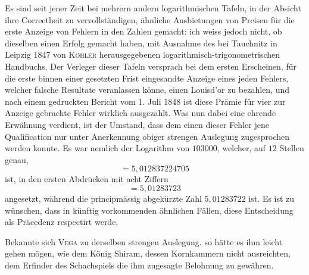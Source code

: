 Es sind seit jener Zeit bei mehrern andern logarithmischen Tafeln, in der
Absicht ihre Correctheit zu vervollständigen, ähnliche Ausbietungen von Preisen
für die erste Anzeige von Fehlern in den Zahlen gemacht: ich weiss jedoch nicht,
ob dieselben einen Erfolg gemacht haben, mit Ausnahme des bei Tauchnitz in
Leipzig $1847$ von \textsc{Köhler} herausgegebenen logarithmisch-trigonometrischen Handbuchs. Der Verleger dieser Tafeln versprach bei dem ersten Erscheinen, für die erste
binnen einer gesetzten Frist eingesandte Anzeige eines jeden Fehlers, welcher
falsche Resultate veranlassen könne, einen Louisd'or zu bezahlen, und nach einem gedruckten Bericht vom 1. Juli 1848 ist diese Prämie für vier zur Anzeige
gebrachte Fehler wirklich ausgezahlt. Was nun dabei eine ehrende Erwähnung
verdient, ist der Umstand, dass dem einen dieser Fehler jene Qualification nur
unter Anerkennung obiger strengen Auslegung zugesprochen werden konnte. Es
war nemlich der Logarithm von \(103000\), welcher, auf \(12\) Stellen genau,
\[
=5{,}012837224705
\]
ist, in den ersten Abdrücken mit acht Ziffern
\[
=5{,}01283723
\]
angesetzt, während die principmässig abgekürzte Zahl \(5{,}01283722\) ist. Es ist
zu wünschen, dass in künftig vorkommenden ähnlichen Fällen, diese Entscheidung als Präcedenz respectirt werde.

Bekannte sich \textsc{Vega} zu derselben strengen Auslegung. so hätte es ihm leicht
gehen mögen, wie dem König Shiram, dessen Kornkammern nicht ausreichten,
dem Erfinder des Schachspiels die ihm zugesagte Belohnung zu gewähren.

